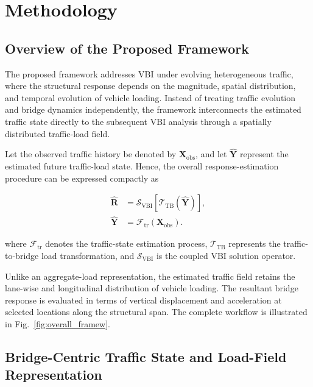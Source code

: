 \documentclass[journal]{IEEEtran}
\begin{document}
\section{Methodology}
\subsection{Overview of the Proposed Framework}
\label{sec:framework_overview}

The proposed framework addresses VBI under evolving heterogeneous traffic, where the structural response depends on the magnitude, spatial distribution, and temporal evolution of vehicle loading. Instead of treating traffic evolution and bridge dynamics independently, the framework interconnects the estimated traffic state directly to the subsequent VBI analysis through a spatially distributed traffic-load field.

Let the observed traffic history be denoted by $\mathbf{X}_{\mathrm{obs}}$, and let $\widehat{\mathbf{Y}}$ represent the estimated future traffic-load state. Hence, the overall response-estimation procedure can be expressed compactly as

\begin{equation}
\begin{aligned}
\widehat{\mathbf{R}}
&=
\mathcal{S}_{\mathrm{VBI}}
\left[
\mathcal{T}_{\mathrm{TB}}
\left(
\widehat{\mathbf{Y}}
\right)
\right],
\\
\widehat{\mathbf{Y}}
&=
\mathcal{F}_{\mathrm{tr}}
\left(
\mathbf{X}_{\mathrm{obs}}
\right).
\end{aligned}
\label{eq:overall_framework}
\end{equation}

where $\mathcal{F}_{\mathrm{tr}}$ denotes the traffic-state estimation process, $\mathcal{T}_{\mathrm{TB}}$ represents the traffic-to-bridge load transformation, and $\mathcal{S}_{\mathrm{VBI}}$ is the coupled VBI solution operator.

Unlike an aggregate-load representation, the estimated traffic field retains the lane-wise and longitudinal distribution of vehicle loading. The resultant bridge response is evaluated in terms of vertical displacement and acceleration at selected locations along the structural span. The complete workflow is illustrated in Fig.~\ref{fig:overall_framew}.

\subsection{Bridge-Centric Traffic State and Load-Field Representation}
\label{sec:traffic_state_representation}
\end{document}
